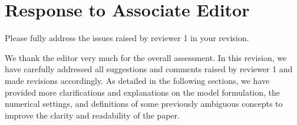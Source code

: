 \hypertarget{Response to AE}{}
\section*{Response to Associate Editor}
\begin{revcomment}[AE]
	Please fully address the issues raised by reviewer 1 in your revision.
\end{revcomment}

\begin{revresponse}[AE]
	We thank the editor very much for the overall assessment. In this revision, we have carefully addressed all suggestions and comments raised by reviewer 1 and made revisions accordingly. As detailed in the following sections, we have provided more clarifications and explanations on the model formulation, the numerical settings, and definitions of some previously ambiguous concepts to improve the clarity and readability of the paper.
\end{revresponse}
